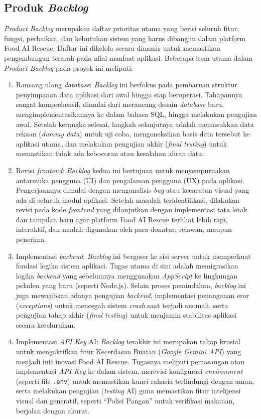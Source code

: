 \subsection{Produk \textit{Backlog}}
\textit{Product Backlog} merupakan daftar prioritas utama yang berisi seluruh fitur, fungsi, perbaikan, dan kebutuhan sistem yang harus dibangun dalam platform Food AI Rescue. Daftar ini dikelola secara dinamis untuk memastikan pengembangan terarah pada nilai manfaat aplikasi. Beberapa item utama dalam \textit{Product Backlog} pada proyek ini meliputi:
\begin{enumerate}
    \item Rancang ulang \textit{database}: \textit{Backlog} ini berfokus pada pembaruan struktur penyimpanan data aplikasi dari awal hingga siap beroperasi. Tahapannya sangat komprehensif, dimulai dari merancang desain \textit{database} baru, mengimplementasikannya ke dalam bahasa SQL, hingga melakukan pengujian awal. Setelah kerangka selesai, langkah selanjutnya adalah memasukkan data rekaan (\textit{dummy data}) untuk uji coba, mengoneksikan basis data tersebut ke aplikasi utama, dan melakukan pengujian akhir (\textit{final testing}) untuk memastikan tidak ada kebocoran atau kesalahan aliran data.
    \item Revisi \textit{frontend}: \textit{Backlog} kedua ini bertujuan untuk menyempurnakan antarmuka pengguna (UI) dan pengalaman pengguna (UX) pada aplikasi. Pengerjaannya dimulai dengan menganalisis \textit{bug} atau kecacatan visual yang ada di seluruh modul aplikasi. Setelah masalah teridentifikasi, dilakukan revisi pada kode \textit{frontend} yang dilanjutkan dengan implementasi tata letak dan tampilan baru agar platform Food AI Rescue terlihat lebih rapi, interaktif, dan mudah digunakan oleh para donatur, relawan, maupun penerima.
    \item Implementasi \textit{backend}: \textit{Backlog} ini bergeser ke sisi server untuk memperkuat fondasi logika sistem aplikasi. Tugas utama di sini adalah memigrasikan logika \textit{backend} yang sebelumnya menggunakan \textit{AppScript} ke lingkungan peladen yang baru (seperti Node.js). Selain proses pemindahan, \textit{backlog} ini juga mewajibkan adanya pengujian \textit{backend}, implementasi penanganan eror (\textit{exceptions}) untuk mencegah sistem \textit{crash} saat terjadi anomali, serta pengujian tahap akhir (\textit{final testing}) untuk menjamin stabilitas aplikasi secara keseluruhan.
    \item Implementasi \textit{API Key} AI: \textit{Backlog} terakhir ini merupakan tahap krusial untuk mengaktifkan fitur Kecerdasan Buatan (\textit{Google Gemini API}) yang menjadi inti inovasi Food AI Rescue. Tugasnya meliputi pemasangan atau implementasi \textit{API Key} ke dalam sistem, merevisi konfigurasi \textit{environment} (seperti file \texttt{.env}) untuk memastikan kunci rahasia terlindungi dengan aman, serta melakukan pengujian (\textit{testing} AI) guna memastikan fitur intelijensi visual dan generatif, seperti ``Polisi Pangan'' untuk verifikasi makanan, berjalan dengan akurat.
\end{enumerate}
